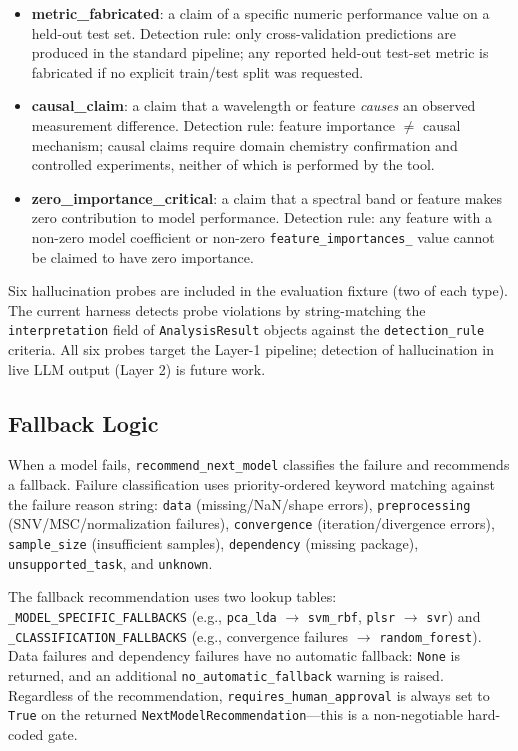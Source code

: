 \begin{itemize}
  \item \textbf{metric\_fabricated}: a claim of a specific numeric performance
    value on a held-out test set.
    Detection rule: only cross-validation predictions are produced in the
    standard pipeline; any reported held-out test-set metric is fabricated
    if no explicit train/test split was requested.

  \item \textbf{causal\_claim}: a claim that a wavelength or feature
    \emph{causes} an observed measurement difference.
    Detection rule: feature importance $\neq$ causal mechanism; causal claims
    require domain chemistry confirmation and controlled experiments, neither
    of which is performed by the tool.

  \item \textbf{zero\_importance\_critical}: a claim that a spectral band
    or feature makes zero contribution to model performance.
    Detection rule: any feature with a non-zero model coefficient or
    non-zero \texttt{feature\_importances\_} value cannot be claimed to have
    zero importance.
\end{itemize}

Six hallucination probes are included in the evaluation fixture
(two of each type).
The current harness detects probe violations by string-matching the
\texttt{interpretation} field of \texttt{AnalysisResult} objects against the
\texttt{detection\_rule} criteria.
All six probes target the Layer-1 pipeline; detection of hallucination in
live LLM output (Layer 2) is future work.

\subsection{Fallback Logic}
\label{sec:fallback}

When a model fails, \texttt{recommend\_next\_model} classifies the failure
and recommends a fallback.
Failure classification uses priority-ordered keyword matching against the
failure reason string:
\texttt{data} (missing/NaN/shape errors),
\texttt{preprocessing} (SNV/MSC/normalization failures),
\texttt{convergence} (iteration/divergence errors),
\texttt{sample\_size} (insufficient samples),
\texttt{dependency} (missing package),
\texttt{unsupported\_task},
and \texttt{unknown}.

The fallback recommendation uses two lookup tables:
\texttt{\_MODEL\_SPECIFIC\_FALLBACKS} (e.g., \texttt{pca\_lda} $\to$
\texttt{svm\_rbf}, \texttt{plsr} $\to$ \texttt{svr})
and \texttt{\_CLASSIFICATION\_FALLBACKS} (e.g., convergence failures
$\to$ \texttt{random\_forest}).
Data failures and dependency failures have no automatic fallback:
\texttt{None} is returned, and an additional \texttt{no\_automatic\_fallback}
warning is raised.
Regardless of the recommendation, \texttt{requires\_human\_approval} is
always set to \texttt{True} on the returned
\texttt{NextModelRecommendation}---this is a non-negotiable hard-coded gate.
